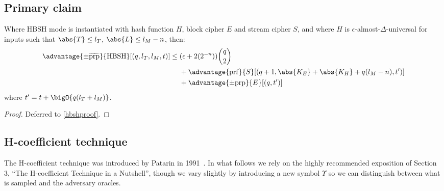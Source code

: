 \documentclass[eprint.tex]{subfiles}
\begin{document}
\subsection{Primary claim}
\begin{theorem}\label{hbshadvantage}
    Where HBSH mode is instantiated with hash function $H$, block cipher $E$ and stream cipher $S$,
    and where $H$ is $\epsilon$-almost-$\Delta$-universal for inputs such that
    $\abs{T} \leq l_T$, $\abs{L} \leq l_M - n$, then:
    \begin{align*}
        \advantage{\pm \widetilde{\mathrm{prp}}}{\HBSH}[(q, l_T, l_M, t)]
        \leq {}&(\epsilon + 2(2^{-n}))\binom{q}{2} \\
        {}&+ \advantage{\mathrm{prf}}{S}[(q + 1, \abs{K_E} + \abs{K_H} + q(l_M - n), t')] \\
        {}&+ \advantage{\pm \mathrm{prp}}{E}[(q, t')]\\
    \end{align*}
    where $t' = t + \bigO{q(l_T + l_M)}$.
\end{theorem}

\begin{proof}Deferred to \autoref{hbshproof}.\renewcommand{\qedsymbol}{}
\end{proof}

\subsection{H-coefficient technique}
The H-coefficient technique was introduced by Patarin in 1991~\cite{ppdes,hco}.
In what follows we rely on the highly recommended exposition of
\cite{hco2} Section 3,
``The H-coefficient Technique in a Nutshell'', though we vary slightly by introducing
a new symbol $\Upsilon$ so we can distinguish between what is sampled and the adversary oracles.
\end{document}
